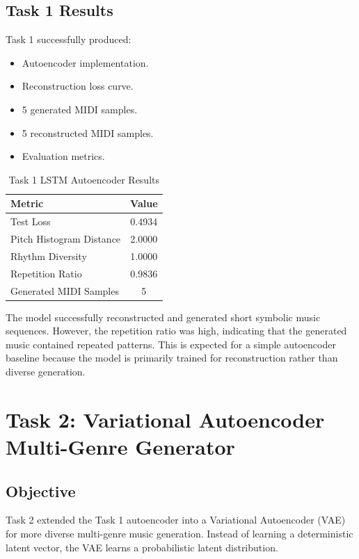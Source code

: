 \documentclass[conference]{IEEEtran}
\begin{document}
\subsection{Task 1 Results}

Task 1 successfully produced:

\begin{itemize}
    \item Autoencoder implementation.
    \item Reconstruction loss curve.
    \item 5 generated MIDI samples.
    \item 5 reconstructed MIDI samples.
    \item Evaluation metrics.
\end{itemize}

\begin{table}[h]
\centering
\caption{Task 1 LSTM Autoencoder Results}
\begin{tabular}{lc}
\toprule
Metric & Value \\
\midrule
Test Loss & 0.4934 \\
Pitch Histogram Distance & 2.0000 \\
Rhythm Diversity & 1.0000 \\
Repetition Ratio & 0.9836 \\
Generated MIDI Samples & 5 \\
\bottomrule
\end{tabular}
\end{table}

The model successfully reconstructed and generated short symbolic music sequences. However, the repetition ratio was high, indicating that the generated music contained repeated patterns. This is expected for a simple autoencoder baseline because the model is primarily trained for reconstruction rather than diverse generation.

\section{Task 2: Variational Autoencoder Multi-Genre Generator}

\subsection{Objective}

Task 2 extended the Task 1 autoencoder into a Variational Autoencoder (VAE) for more diverse multi-genre music generation. Instead of learning a deterministic latent vector, the VAE learns a probabilistic latent distribution.
\end{document}
